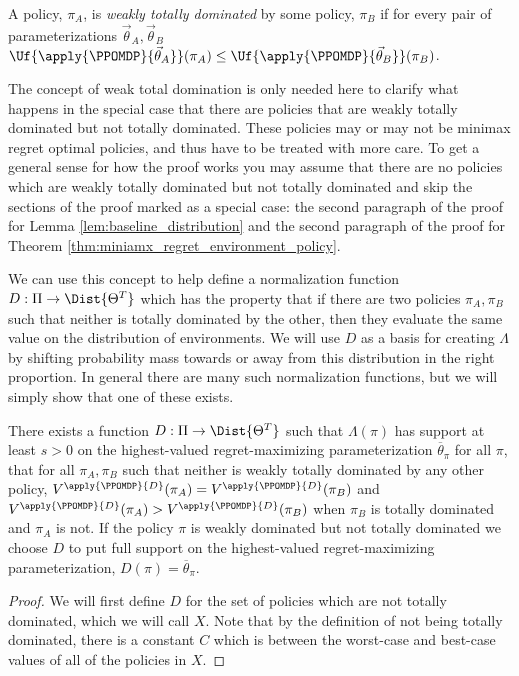 \documentclass{article}
\begin{document}
\begin{appendix}
\begin{defn}
A policy, $\pi_A$, is \emph{weakly totally dominated} by some policy, $\pi_B$ if for every pair of parameterizations $\vec{\theta}_A, \vec{\theta}_B$ $\Uf{\apply{\PPOMDP}{\vec{\theta}_A}}(\pi_A) \leq \Uf{\apply{\PPOMDP}{\vec{\theta}_B}}(\pi_B)$.
\end{defn} 

The concept of weak total domination is only needed here to clarify what happens in the special case that there are policies that are weakly totally dominated but not totally dominated.  These policies may or may not be minimax regret optimal policies, and thus have to be treated with more care.  To get a general sense for how the proof works you may assume that there are no policies which are weakly totally dominated but not totally dominated and skip the sections of the proof marked as a special case: the second paragraph of the proof for Lemma \ref{lem:baseline_distribution} and the second paragraph of the proof for Theorem \ref{thm:miniamx_regret_environment_policy}.

We can use this concept to help define a normalization function $D: \Pi \rightarrow \Dist{\Theta^T}$ which has the property that if there are two policies $\pi_A,\pi_B$ such that neither is totally dominated by the other, then they evaluate the same value on the distribution of environments.  We will use $D$ as a basis for creating $\Lambda$ by shifting probability mass towards or away from this distribution in the right proportion.  In general there are many such normalization functions, but we will simply show that one of these exists.

\begin{lemma}
\label{lem:baseline_distribution}
    There exists a function $D: \Pi \rightarrow \Dist{\Theta^T}$ such that $\Lambda(\pi)$ has support at least $s > 0$ on the highest-valued regret-maximizing parameterization $\overline{\theta}_{\pi}$ for all $\pi$,  that for all $\pi_A, \pi_B$ such that neither is weakly totally dominated by any other policy, $V^{\apply{\PPOMDP}{D}}(\pi_A) = V^{\apply{\PPOMDP}{D}}(\pi_B)$ and $V^{\apply{\PPOMDP}{D}}(\pi_A) > V^{\apply{\PPOMDP}{D}}(\pi_B)$ when $\pi_B$ is totally dominated and $\pi_A$ is not.  If the policy $\pi$ is weakly dominated but not totally dominated we choose $D$ to put full support on the highest-valued regret-maximizing parameterization, $D(\pi) = \overline{\theta}_{\pi}$.
\end{lemma}
\begin{proof}
    We will first define $D$ for the set of policies which are not totally dominated, which we will call $X$.  Note that by the definition of not being totally dominated, there is a constant $C$ which is between the worst-case and best-case values of all of the policies in $X$. 
    

\end{proof}
\end{appendix}
\end{document}
